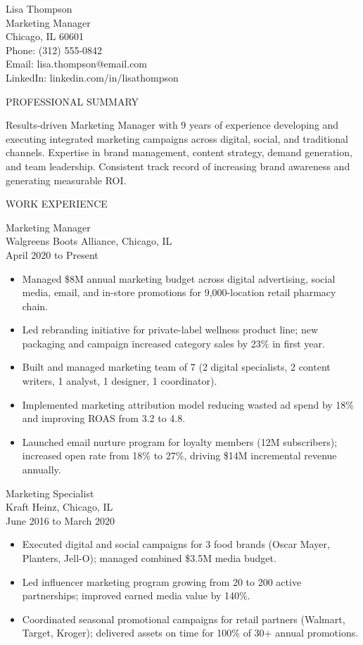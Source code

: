 \documentclass[11pt,a4paper]{article}
\begin{document}
\noindent Lisa Thompson\\
Marketing Manager\\
Chicago, IL 60601\\
Phone: (312) 555-0842\\
Email: lisa.thompson@email.com\\
LinkedIn: linkedin.com/in/lisathompson

\vspace{10pt}

PROFESSIONAL SUMMARY

Results-driven Marketing Manager with 9 years of experience developing and executing integrated marketing campaigns across digital, social, and traditional channels. Expertise in brand management, content strategy, demand generation, and team leadership. Consistent track record of increasing brand awareness and generating measurable ROI.

\vspace{8pt}

WORK EXPERIENCE

Marketing Manager\\
Walgreens Boots Alliance, Chicago, IL\\
April 2020 to Present
\begin{itemize}
  \item Managed \$8M annual marketing budget across digital advertising, social media, email, and in-store promotions for 9,000-location retail pharmacy chain.
  \item Led rebranding initiative for private-label wellness product line; new packaging and campaign increased category sales by 23\% in first year.
  \item Built and managed marketing team of 7 (2 digital specialists, 2 content writers, 1 analyst, 1 designer, 1 coordinator).
  \item Implemented marketing attribution model reducing wasted ad spend by 18\% and improving ROAS from 3.2 to 4.8.
  \item Launched email nurture program for loyalty members (12M subscribers); increased open rate from 18\% to 27\%, driving \$14M incremental revenue annually.
\end{itemize}

\vspace{4pt}

Marketing Specialist\\
Kraft Heinz, Chicago, IL\\
June 2016 to March 2020
\begin{itemize}
  \item Executed digital and social campaigns for 3 food brands (Oscar Mayer, Planters, Jell-O); managed combined \$3.5M media budget.
  \item Led influencer marketing program growing from 20 to 200 active partnerships; improved earned media value by 140\%.
  \item Coordinated seasonal promotional campaigns for retail partners (Walmart, Target, Kroger); delivered assets on time for 100\% of 30+ annual promotions.
\end{itemize}
\end{document}
